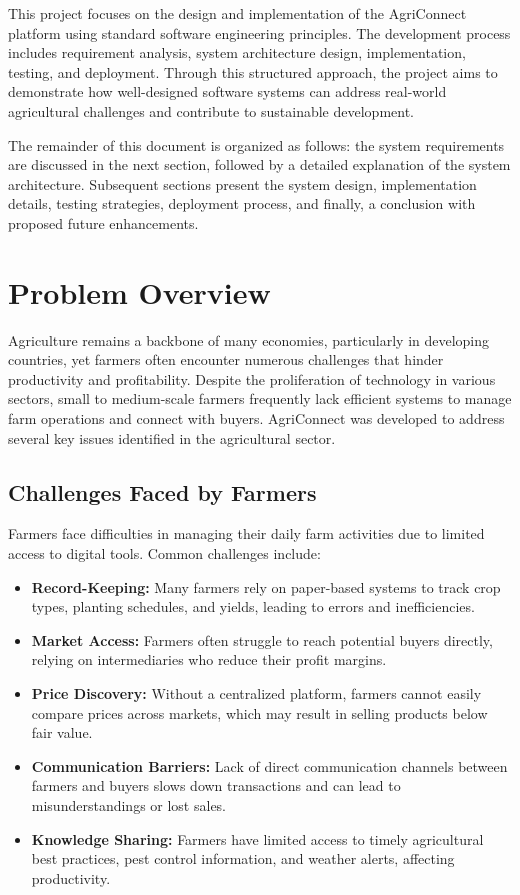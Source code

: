 \documentclass[12pt,a4paper]{article}
\begin{document}
This project focuses on the design and implementation of the AgriConnect platform using standard software engineering principles. The development process includes requirement analysis, system architecture design, implementation, testing, and deployment. Through this structured approach, the project aims to demonstrate how well-designed software systems can address real-world agricultural challenges and contribute to sustainable development.


The remainder of this document is organized as follows: the system requirements are discussed in the next section, followed by a detailed explanation of the system architecture. Subsequent sections present the system design, implementation details, testing strategies, deployment process, and finally, a conclusion with proposed future enhancements.

\section{Problem Overview}

Agriculture remains a backbone of many economies, particularly in developing countries, yet farmers often encounter numerous challenges that hinder productivity and profitability. Despite the proliferation of technology in various sectors, small to medium-scale farmers frequently lack efficient systems to manage farm operations and connect with buyers. AgriConnect was developed to address several key issues identified in the agricultural sector.

\subsection{Challenges Faced by Farmers}
Farmers face difficulties in managing their daily farm activities due to limited access to digital tools. Common challenges include:

\begin{itemize}
    \item \textbf{Record-Keeping:} Many farmers rely on paper-based systems to track crop types, planting schedules, and yields, leading to errors and inefficiencies.
    \item \textbf{Market Access:} Farmers often struggle to reach potential buyers directly, relying on intermediaries who reduce their profit margins.
    \item \textbf{Price Discovery:} Without a centralized platform, farmers cannot easily compare prices across markets, which may result in selling products below fair value.
    \item \textbf{Communication Barriers:} Lack of direct communication channels between farmers and buyers slows down transactions and can lead to misunderstandings or lost sales.
    \item \textbf{Knowledge Sharing:} Farmers have limited access to timely agricultural best practices, pest control information, and weather alerts, affecting productivity.
\end{itemize}
\end{document}
